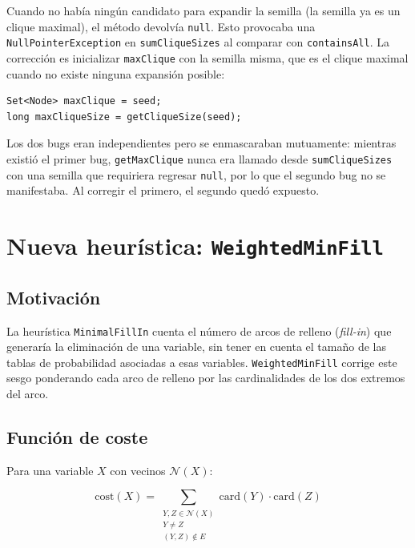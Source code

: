 \documentclass[11pt, a4paper]{article}
\begin{document}
Cuando no había ningún candidato para expandir la semilla (la semilla ya es un clique maximal), el método devolvía \texttt{null}. Esto provocaba una \texttt{NullPointerException} en \texttt{sumCliqueSizes} al comparar con \texttt{containsAll}. La corrección es inicializar \texttt{maxClique} con la semilla misma, que es el clique maximal cuando no existe ninguna expansión posible:

\begin{lstlisting}[caption={Inicialización corregida}]
Set<Node> maxClique = seed;
long maxCliqueSize = getCliqueSize(seed);
\end{lstlisting}

Los dos bugs eran independientes pero se enmascaraban mutuamente: mientras existió el primer bug, \texttt{getMaxClique} nunca era llamado desde \texttt{sumCliqueSizes} con una semilla que requiriera regresar \texttt{null}, por lo que el segundo bug no se manifestaba. Al corregir el primero, el segundo quedó expuesto.

\section{Nueva heurística: \texttt{WeightedMinFill}}
\label{sec:wmf}

\subsection{Motivación}

La heurística \texttt{MinimalFillIn} cuenta el número de arcos de relleno (\emph{fill-in}) que generaría la eliminación de una variable, sin tener en cuenta el tamaño de las tablas de probabilidad asociadas a esas variables. \texttt{WeightedMinFill} corrige este sesgo ponderando cada arco de relleno por las cardinalidades de los dos extremos del arco.

\subsection{Función de coste}

Para una variable $X$ con vecinos $\mathcal{N}(X)$:

\begin{equation}
  \mathrm{cost}(X) = \sum_{\substack{Y, Z \in \mathcal{N}(X) \\ Y \neq Z \\ (Y,Z) \notin E}} \mathrm{card}(Y) \cdot \mathrm{card}(Z)
  \label{eq:wmf}
\end{equation}
\end{document}
